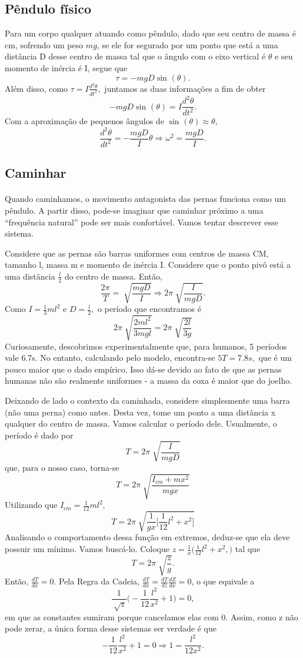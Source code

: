\documentclass[physicsII_notes.tex]{subfiles}
\begin{document}
\subsection{Pêndulo físico}
Para um corpo qualquer atuando como pêndulo, dado que seu centro de massa é cm, sofrendo um peso \(mg\), se ele for segurado por um ponto que está a uma distância
D desse centro de massa tal que o ângulo com o eixo vertical é \(\theta \) e seu momento de inércia é I, segue que
\[
	\tau  = -mgD\sin^{}{(\theta )}.
\]
Além disso, como \(\tau = I \frac{d^{2}\theta }{dt^{2}},\) juntamos as duas informações a fim de obter
\[
	-mgD\sin^{}{(\theta )} = I \frac{d^{2}\theta }{dt^{2}}.
\]
Com a aproximação de pequenos ângulos de \(\sin^{}{(\theta )}\approx \theta \),
\[
	\frac{d^{2}\theta }{dt^{2}} = -\frac{mgD}{I}\theta \Rightarrow \omega^{2}= \frac{mgD}{I}.
\]
\subsection{Caminhar}
\paragraph{} Quando caminhamos, o movimento antagonista das pernas funciona como um pêndulo. A partir disso, pode-se imaginar que caminhar próximo
a uma ``frequência natural'' pode ser mais confortável. Vamos tentar descrever esse sistema.

Considere que as pernas são barras uniformes com centros de massa CM, tamanho l, massa m e momento de inércia I. Considere
que o ponto pivô está a uma distância \(\frac{l}{2}\) do centro de massa. Então,
\[
	\frac{2\pi }{T} = \sqrt[]{\frac{mgD}{I}} \Rightarrow 2\pi \sqrt[]{\frac{I}{mgD}}.
\]
Como \(I = \frac{1}{3}ml^{2}\) e \(D = \frac{l}{2},\) o período que encontramos é
\[
	2\pi \sqrt[]{\frac{2ml^{2}}{3mgl}} = 2\pi \sqrt[]{\frac{2l}{3g}}
\]
Curiosamente, descobrimos experimentalmente que, para humanos, 5 períodos vale 6.7s. No entanto,
calculando pelo modelo, encontra-se \(5T=7.8s,\) que é um pouco maior que o dado empírico. Isso dá-se
devido ao fato de que as pernas humanas não são realmente uniformes - a massa da coxa é maior que do joelho.

Deixando de lado o contexto da caminhada, considere simplesmente uma barra (não uma perna) como antes. Desta vez,
tome um ponto a uma distância x qualquer do centro de massa. Vamos calcular o período dele.
Usualmente, o período é dado por
\[
	T = 2\pi \sqrt[]{\frac{I}{mgD}}
\]
que, para o nosso caso, torna-se
\[
	T = 2\pi \sqrt[]{\frac{I_{cm}+mx^{2}}{mgx}}
\]
Utilizando que \(I_{cm}= \frac{1}{12}ml^{2},\)
\[
	T = 2\pi \sqrt[]{\frac{1}{gx}\biggl[\frac{1}{12}l^{2}+x^{2}\biggr]}
\]
Analisando o comportamento dessa função em extremos, deduz-se que ela deve possuir um mínimo. Vamos buscá-lo.
Coloque \(z = \frac{1}{x}\biggl(\frac{1}{12}l^{2}+x^{2},\biggr)\) tal que
\[
	T = 2\pi \sqrt[]{\frac{z}{g}}.
\]
Então, \(\frac{dT}{dx}=0\). Pela Regra da Cadeia, \(\frac{dT}{dx} = \frac{dT}{dz}\frac{dZ}{dx} = 0\), o que equivale a
\[
	\frac{1}{\sqrt[]{z}}\biggl(-\frac{1}{12}\frac{l^{2}}{x^{2}}+1\biggr) = 0,
\]
em que as constantes sumiram porque cancelamos elas com 0. Assim, como z não pode zerar, a única forma desse sistemas ser verdade é que
\[
	-\frac{1}{12}\frac{l^{2}}{x^{2}}+1 = 0 \Rightarrow 1 = \frac{l^{2}}{12x^{2}}.
\]
\end{document}
